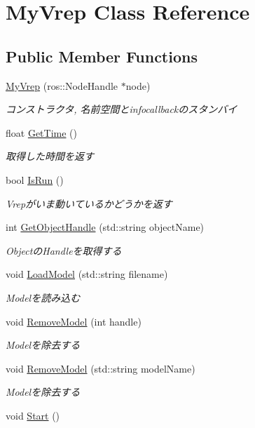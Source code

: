 \section{My\-Vrep Class Reference}
\label{classMyVrep}
\subsection*{Public Member Functions}
\begin{DoxyCompactItemize}
\item 
\hyperlink{classMyVrep_ad04ad612d83dea285cfcc994d5904849}{My\-Vrep} (ros\-::\-Node\-Handle $\ast$node)
\begin{DoxyCompactList}\small\item\em コンストラクタ, 名前空間とinfocallbackのスタンバイ \end{DoxyCompactList}\item 
float \hyperlink{classMyVrep_a301856627257f56ea4dc62f40cd53505}{Get\-Time} ()
\begin{DoxyCompactList}\small\item\em 取得した時間を返す \end{DoxyCompactList}\item 
bool \hyperlink{classMyVrep_a24aa7c4b24ff512a366b0a0cdacdc867}{Is\-Run} ()
\begin{DoxyCompactList}\small\item\em Vrepがいま動いているかどうかを返す \end{DoxyCompactList}\item 
int \hyperlink{classMyVrep_a0c2040190b0326acba9ef14ce74a5d6f}{Get\-Object\-Handle} (std\-::string object\-Name)
\begin{DoxyCompactList}\small\item\em Objectの\-Handleを取得する \end{DoxyCompactList}\item 
void \hyperlink{classMyVrep_a0f2e523e6a68bde936c224b83d60af66}{Load\-Model} (std\-::string filename)
\begin{DoxyCompactList}\small\item\em Modelを読み込む \end{DoxyCompactList}\item 
void \hyperlink{classMyVrep_add24917b44a09b75496d76d8cda107af}{Remove\-Model} (int handle)
\begin{DoxyCompactList}\small\item\em Modelを除去する \end{DoxyCompactList}\item 
void \hyperlink{classMyVrep_ae9f091cd4ea81eb42d564ccb3de6d034}{Remove\-Model} (std\-::string model\-Name)
\begin{DoxyCompactList}\small\item\em Modelを除去する \end{DoxyCompactList}\item 
void \hyperlink{classMyVrep_a8e56cc5f090220b30c27ead7d0484e49}{Start} ()\label{classMyVrep_a8e56cc5f090220b30c27ead7d0484e49}


\end{DoxyCompactItemize}
